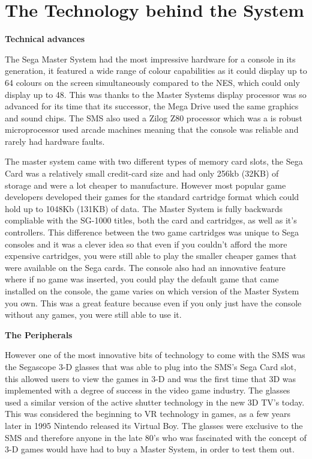 \documentclass{scrartcl}
\begin{document}
\section{The Technology behind the System}

\textbf{Technical advances} \par

The Sega Master System had the most impressive hardware for a console in its generation, it featured a wide range of colour capabilities as it could display up to 64 colours on the screen simultaneously compared to the NES\cite{racket}, which could only display up to 48. This was thanks to the Master Systems display processor was so advanced for its time that its successor, the Mega Drive used the same graphics and sound chips. The SMS also used a Zilog Z80 processor which was a is robust microprocessor used arcade machines meaning that the console was reliable and rarely had hardware faults.\cite{russell} 

The master system came with two different types of memory card slots, the Sega Card was a relatively small credit-card size and had only 256kb (32KB) of storage and were a lot cheaper to manufacture. However most popular game developers developed their games for the standard cartridge format which could hold up to 1048Kb (131KB) of data. \cite{Weiss2009} The Master System is fully backwards compliable with the SG-1000 titles, both the card and cartridges, as well as it's controllers. \cite{racket} This difference between the two game cartridges was unique to Sega consoles and it was a clever idea so that even if you couldn't afford the more expensive cartridges, you were still able to play the smaller cheaper games that were available on the Sega cards. The console also had an innovative feature where if no game was inserted, you could play the default game that came installed on the console, the game varies on which version of the Master System you own. This was a great feature because even if you only just have the console without any games, you were still able to use it.



\textbf{The Peripherals} \par

However one of the most innovative bits of technology to come with the SMS was the Segascope 3-D glasses that was able to plug into the SMS's Sega Card slot, this allowed users to view the games in 3-D and was the first time that 3D was implemented with a degree of success in the video game industry. The glasses used a similar version of the active shutter technology in the new 3D TV's today.\cite{SegaScopeTech} This was considered the beginning to VR technology in games, as a few years later in 1995 Nintendo released its Virtual Boy. \cite{Workman} The glasses were exclusive to the SMS and therefore anyone in the late 80's who was fascinated with the concept of 3-D games would have had to buy a Master System, in order to test them out.
\end{document}
